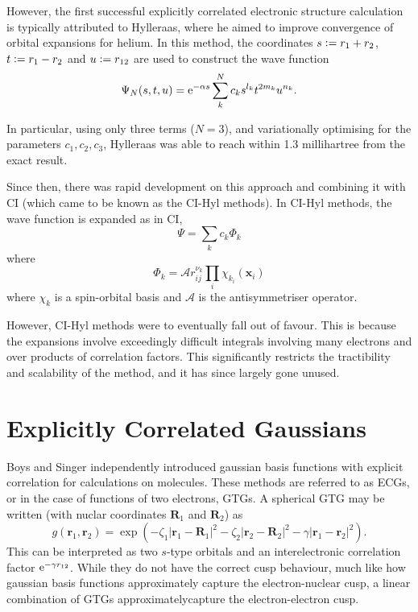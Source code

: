 However, the first successful explicitly correlated electronic structure calculation is typically attributed to Hylleraas,\cite{hattigExplicitly2012} where he aimed to improve convergence of orbital expansions for helium.\cite{hylleraasUeber1928,hylleraasNeue1929} In this method, the coordinates $s\mathrel{\mathop:}= r_1+r_2$, $t\mathrel{\mathop:}= r_1 - r_2$ and $u\mathrel{\mathop:}= r_{12}$ are used to construct the wave function
\begin{equation}
    \Psi_N(s,t,u) = \mathrm{e}^{-\alpha s}\sum_{k}^N c_ks^{l_k}t^{2m_k}u^{n_k}.
\end{equation}

In particular, using only three terms ($N=3$), and variationally optimising for the parameters $c_1,c_2,c_3$, Hylleraas was able to reach within 1.3 millihartree from the exact result.

Since then, there was rapid development on this approach and combining it with \gls{CI} (which came to be known as the CI-Hyl methods).
\cite{largo-cabrerizoHylleraasCI1987,jamesGround1933,kolosAccurate1964,perkinsAtomic1968,perkinsAtomic1969,simsCombined1971,simsOneCenter1971,claryHylleraastype1977,claryCIHylleraas1976} In CI-Hyl methods, the wave function is expanded as in \gls{CI},
\begin{equation}
    \Psi = \sum_k c_k \Phi_k
\end{equation}
where
\begin{equation}
    \Phi_k = \mathcal{A} r^{\nu_k}_{ij}\prod_i\chi_{k_i}(\bm x_i)
\end{equation}
where ${\chi_k}$ is a spin-orbital basis and $\mathcal{A}$ is the antisymmetriser operator.

However, CI-Hyl methods were to eventually fall out of favour. This is because the expansions involve exceedingly difficult integrals involving many electrons and over products of correlation factors. This significantly restricts the tractibility and scalability of the method, and it has since largely gone unused.

\section{Explicitly Correlated Gaussians}

Boys\cite{boysIntegral1960} and Singer\cite{singerUse1960} independently introduced gaussian basis functions with explicit correlation for calculations on molecules.\cite{mitroyTheory2013} These methods are referred to as \glspl{ECG}, or in the case of functions of two electrons, \glspl{GTG}. A spherical \gls{GTG} may be written (with nuclar coordinates $\bm R_1$ and $\bm R_2$) as
\begin{equation}
    g(\bm r_1, \bm r_2) = \exp(-\zeta_1|\bm r_1 - \bm R_1|^2 - \zeta_2|\bm r_2 - \bm R_2|^2 - \gamma|\bm r_1 - \bm r_2|^2).
\end{equation}
This can be interpreted as two $s$-type orbitals and an interelectronic correlation factor $\mathrm{e}^{-\gamma r_{12}}$.
While they do not have the correct cusp behaviour, much like how gaussian basis functions approximately capture the electron-nuclear cusp, a linear combination of \glspl{GTG} approximatelycapture the electron-electron cusp.

